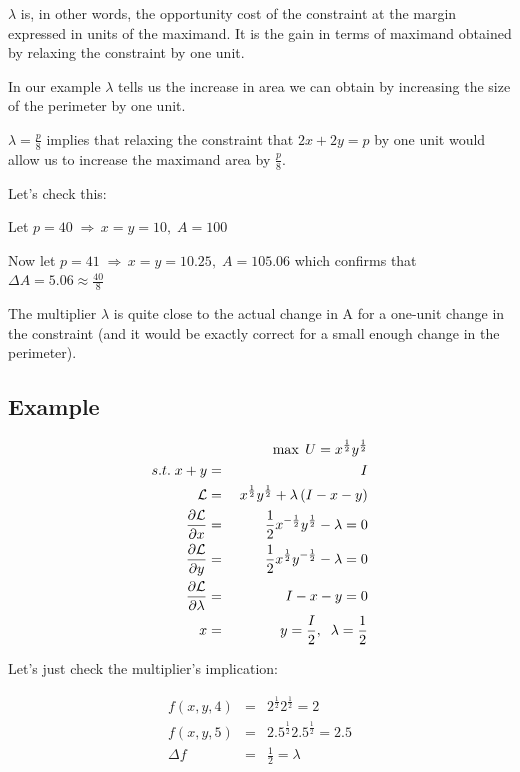 \documentclass[11pt,english]{article}
\begin{document}
$\lambda $ is, in other words, the opportunity cost of the constraint at the
margin expressed in units of the maximand. It is the gain in terms of
maximand obtained by relaxing the constraint by one unit.

In our example $\lambda $ tells us the increase in area we can obtain by
increasing the size of the perimeter by one unit.

$\lambda =\frac{p}{8}$ implies that relaxing the constraint that $2x+2y=p$
by one unit would allow us to increase the maximand area by $\frac{p}{8}$.

Let's check this:

Let $p=40\;\Rightarrow \,x=y=10,\;A=100$

Now let $p=41\;\Rightarrow \,x=y=10.25,\;A=105.06$ which confirms that $%
\Delta A=5.06\approx \frac{40}{8}$

The multiplier $\lambda $ is quite close to the actual change in A for a
one-unit change in the constraint (and it would be exactly correct for a
small enough change in the perimeter).


\subsection{Example}

\begin{eqnarray*}
&&\max \;U=x^{\frac{1}{2}}y^{\frac{1}{2}} \\
s.t.\;x+y &=&I \\
\mathcal{L} &=&\;x^{\frac{1}{2}}y^{\frac{1}{2}}+\lambda \left( I-x-y\right)
\\
\frac{\partial \mathcal{L} }{\partial x} &=&\frac{1}{2}x^{-\frac{1}{2}}y^{%
\frac{1}{2}}-\lambda =0 \\
\frac{\partial \mathcal{L} }{\partial y} &=&\frac{1}{2}x^{\frac{1}{2}}y^{-%
\frac{1}{2}}-\lambda =0 \\
\frac{\partial \mathcal{L} }{\partial \lambda } &=&I-x-y=0 \\
x &=&y=\frac{I}{2},\;\;\lambda =\frac{1}{2}
\end{eqnarray*}

Let's just check the multiplier's implication:

\begin{eqnarray*}
f(x,y,4) &=&2^{\frac{1}{2}}2^{\frac{1}{2}}=2 \\
f(x,y,5) &=&2.5^{\frac{1}{2}}2.5^{\frac{1}{2}}=2.5 \\
\Delta f &=&\frac{1}{2}=\lambda
\end{eqnarray*}
\end{document}
